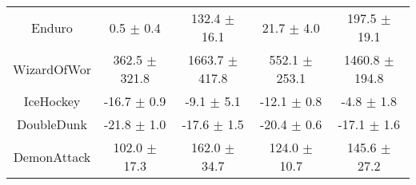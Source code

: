 \begin{table}[H]
{\begin{tabular}{ccccc}
Enduro        &        0.5 $\pm$ 0.4 &     132.4 $\pm$ 16.1 &      21.7 $\pm$ 4.0 &      197.5 $\pm$ 19.1 \\
WizardOfWor   &    362.5 $\pm$ 321.8 &   1663.7 $\pm$ 417.8 &   552.1 $\pm$ 253.1 &    1460.8 $\pm$ 194.8 \\
IceHockey     &      -16.7 $\pm$ 0.9 &       -9.1 $\pm$ 5.1 &     -12.1 $\pm$ 0.8 &        -4.8 $\pm$ 1.8 \\
DoubleDunk    &      -21.8 $\pm$ 1.0 &      -17.6 $\pm$ 1.5 &     -20.4 $\pm$ 0.6 &       -17.1 $\pm$ 1.6 \\
DemonAttack   &     102.0 $\pm$ 17.3 &     162.0 $\pm$ 34.7 &    124.0 $\pm$ 10.7 &      145.6 $\pm$ 27.2 \\
\bottomrule
\end{tabular}}
\end{table}

